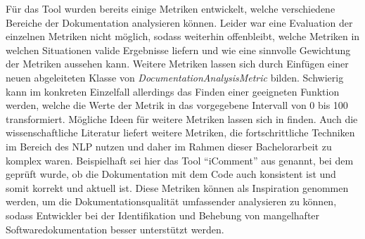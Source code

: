 Für das Tool wurden bereits einige Metriken entwickelt, welche verschiedene Bereiche der Dokumentation analysieren können. Leider war eine Evaluation der einzelnen Metriken nicht möglich, sodass weiterhin offenbleibt, welche Metriken in welchen Situationen valide Ergebnisse liefern und wie eine sinnvolle Gewichtung der Metriken aussehen kann.  Weitere Metriken lassen sich durch Einfügen einer neuen abgeleiteten Klasse von \textit{DocumentationAnalysisMetric} bilden. Schwierig kann im konkreten Einzelfall allerdings das Finden einer geeigneten Funktion werden, welche die Werte der Metrik in das vorgegebene Intervall von 0 bis 100 transformiert. Mögliche Ideen für weitere Metriken lassen sich in \cite{checkstyle_doc_metrics} finden. Auch die wissenschaftliche Literatur liefert weitere Metriken, die fortschrittliche Techniken im Bereich des \ac{NLP} nutzen und daher im Rahmen dieser Bachelorarbeit zu komplex waren. Beispielhaft sei hier das Tool \enquote{iComment} aus  \cite[S.~145ff.]{icomment} genannt, bei dem geprüft wurde, ob die Dokumentation mit dem Code auch konsistent ist und somit korrekt und aktuell ist. Diese Metriken können als Inspiration genommen werden, um die Dokumentationsqualität umfassender analysieren zu können, sodass Entwickler bei der Identifikation und Behebung von mangelhafter Softwaredokumentation  besser unterstützt werden.


